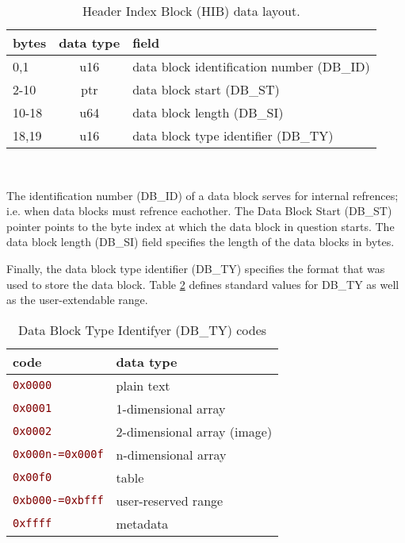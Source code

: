 \documentclass[pagesize=a4]{tufte-book}
\makeatletter
\newcommand{\hex}[1]{\hlred{\texttt{#1}}\label{clsopt:#1}\index{#1 class option@\texttt{#1} class option}\index{class options!#1@\texttt{#1}}}%
\newcommand{\hlred}[1]{\textcolor{Maroon}{#1}}%
\makeatother
\begin{document}
\begin{table}[ht]
	\centering
	\selectfont
	\begin{tabular}{lcl}
		\toprule
		bytes & data type & field\\
		\midrule
		0,1 & u16 & data block identification number (DB\_ID)\\
		2-10 & ptr & data block start (DB\_ST)\\
		10-18 & u64 & data block length (DB\_SI)\\
		18,19 & u16 & data block type identifier (DB\_TY)\\
		\bottomrule
	\end{tabular}
	~\label{tab:hib_fields}
	\caption{Header Index Block (HIB) data layout.}	
\end{table}
\vspace{5mm}

The identification number (DB\_ID) of a data block serves for internal refrences; i.e. when data blocks must refrence eachother. The Data Block Start (DB\_ST) pointer points to the byte index at which the data block in question starts. The data block length (DB\_SI) field specifies the length of the data blocks in bytes.

Finally, the data block type identifier (DB\_TY) specifies the format that was
used to store the data block. Table \ref{tab:data_block_type_codes} defines standard values for DB\_TY as well as the user-extendable range.

\begin{table}[ht]
	\centering
	\selectfont
	\begin{tabular}{ll}
		\toprule
		code & data type\\
		\midrule
		\hex{0x0000} & plain text\\
		\hex{0x0001} & 1-dimensional array\\
		\hex{0x0002} & 2-dimensional array (image)\\
		\hex{0x000n-=0x000f} & n-dimensional array\\
		\hex{0x00f0} & table\\
		\hex{0xb000-=0xbfff} & user-reserved range\\
		\hex{0xffff} & metadata\\
		\bottomrule
	\end{tabular}
	~\label{tab:data_block_type_codes}
	\caption{Data Block Type Identifyer (DB\_TY) codes}
\end{table}
\vspace{5mm}
\end{document}
